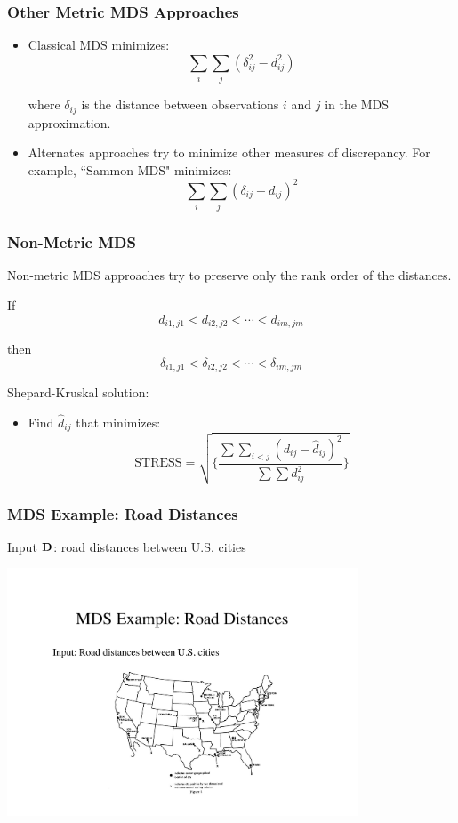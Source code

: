 \documentclass{beamer}
\begin{document}
\begin{frame}
  \frametitle{Other Metric MDS Approaches}

\begin{itemize}
\item Classical MDS minimizes:
\[
\sum_i \sum_j(\delta_{ij}^2 - d_{ij}^2)
\]

where $\delta_{ij}$ is the distance between observations $i$ and $j$ in the MDS approximation.

\item Alternates approaches try to minimize other measures of discrepancy. For example, ``Sammon MDS" minimizes:
\[
\sum_i \sum_j (\delta_{ij} - d_{ij})^2
\]
\end{itemize}
\end{frame}

\begin{frame}
  \frametitle{Non-Metric MDS}

Non-metric MDS approaches try to preserve only the rank order of the distances.

If
\[
d_{i1,j1} < d_{i2,j2} < \cdots< d_{im,jm}
\]

then
\[
\delta_{i1,j1} < \delta_{i2,j2} < \cdots< \delta_{im,jm}
\]

Shepard-Kruskal solution:

\begin{itemize}
\item Find $\hat{d}_{ij}$ that minimizes:
\[
\mbox{STRESS} = \sqrt{ \{ \frac{\sum \sum_{i < j}(d_{ij}-\hat{d}_{ij})^2 }{\sum \sum d_{ij}^2} \} }
\]
\end{itemize}

\bigskip

\end{frame}

\begin{frame}
  \frametitle{MDS Example: Road Distances}

Input $\mathbf{D}$: road distances between U.S. cities

\begin{center}
\includegraphics[height=2.9in]{mds-road}
\end{center}

\end{frame}
\end{document}

